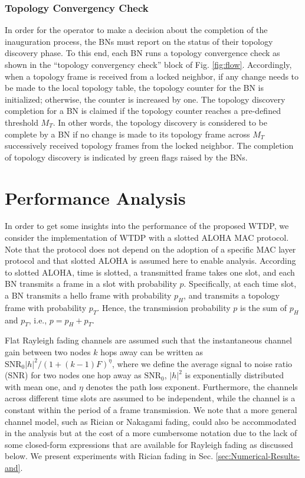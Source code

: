 \documentclass[10pt,english,two column]{IEEEtran}
\begin{document}
\subsubsection{Topology Convergency Check\label{sub:Topology-Convergency-Check}}

In order for the operator to make a decision about the completion
of the inauguration process, the BNs must report on the status of
their topology discovery phase. To this end, each BN runs a topology
convergence check as shown in the ``topology convergency check''
block of Fig. \ref{fig:flow}. Accordingly, when a topology frame
is received from a locked neighbor, if any change needs to be made
to the local topology table, the topology counter for the BN is initialized;
otherwise, the counter is increased by one. The topology discovery
completion for a BN is claimed if the topology counter reaches a pre-defined
threshold $M_{T}$. In other words, the topology discovery is considered
to be complete by a BN if no change is made to its topology frame
across $M_{T}$ successively received topology frames from the locked
neighbor. The completion of topology discovery is indicated by green
flags raised by the BNs. 


\section{Performance Analysis\label{sec:Performance-Analysis-with}}

In order to get some insights into the performance of the proposed
WTDP, we consider the implementation of WTDP with a slotted ALOHA
MAC protocol. Note that the protocol does not depend on the adoption
of a specific MAC layer protocol and that slotted ALOHA is assumed
here to enable analysis. According to slotted ALOHA, time is slotted,
a transmitted frame takes one slot, and each BN transmits a frame
in a slot with probability $p$. Specifically, at each time slot,
a BN transmits a hello frame with probability $p_{H}$, and transmits
a topology frame with probability $p_{T}$. Hence, the transmission
probability $p$ is the sum of $p_{H}$ and $p_{T}$, i.e., $p=p_{H}+p_{T}$. 

Flat Rayleigh fading channels are assumed such that the instantaneous
channel gain between two nodes $k$ hops away can be written as $\mathrm{SNR_{0}}\left|h\right|^{2}/(1+(k-1)F)^{\eta}$,
where we define the average signal to noise ratio (SNR) for two nodes
one hop away as $\mathrm{SN}\mathrm{R}_{0}$, $|h|^{2}$ is exponentially
distributed with mean one, and $\eta$ denotes the path loss exponent.
Furthermore, the channels across different time slots are assumed
to be independent, while the channel is a constant within the period
of a frame transmission. We note that a more general channel model,
such as Rician or Nakagami fading, could also be accommodated in the
analysis but at the cost of a more cumbersome notation due to the
lack of some closed-form expressions that are available for Rayleigh
fading as discussed below. We present experiments with Rician fading
in Sec. \ref{sec:Numerical-Results-and}. 
\end{document}
